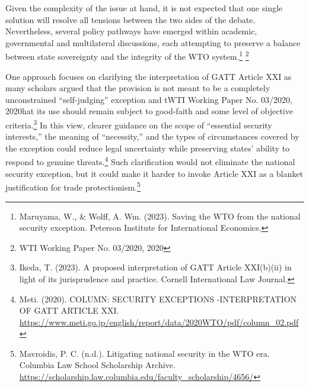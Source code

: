 Given the complexity of the issue at hand, it is not expected that one single solution will resolve all tensions between the two sides of the debate. Nevertheless, several policy pathways have emerged within academic, governmental and multilateral discussions, each attempting to preserve a balance between state sovereignty and the integrity of the WTO system.\footnote{Maruyama, W., \& Wolff, A. Wm. (2023). Saving the WTO from the national security exception. Peterson Institute for International Economics.} \footnote{WTI Working Paper No. 03/2020, 2020}

One approach focuses on clarifying the interpretation of GATT Article XXI as many scholars argued that the provision is not meant to be a completely unconstrained “self-judging” exception and tWTI Working Paper No. 03/2020, 2020hat its use should remain subject to good-faith and some level of objective criteria.\footnote{Ikeda, T. (2023). A proposed interpretation of GATT Article XXI(b)(ii) in light of its jurisprudence and practice. Cornell International Law Journal.} In this view, clearer guidance on the scope of “essential security interests,” the meaning of “necessity,” and the types of circumstances covered by the exception could reduce legal uncertainty while preserving states’ ability to respond to genuine threats.\footnote{Meti. (2020). COLUMN: SECURITY EXCEPTIONS -INTERPRETATION OF GATT ARTICLE XXI. \url{https://www.meti.go.jp/english/report/data/2020WTO/pdf/column_02.pdf}} Such clarification would not eliminate the national security exception, but it could make it harder to invoke Article XXI as a blanket justification for trade protectionism.\footnote{Mavroidis, P. C. (n.d.). Litigating national security in the WTO era. Columbia Law School Scholarship Archive. \url{https://scholarship.law.columbia.edu/faculty_scholarship/4656/}}

